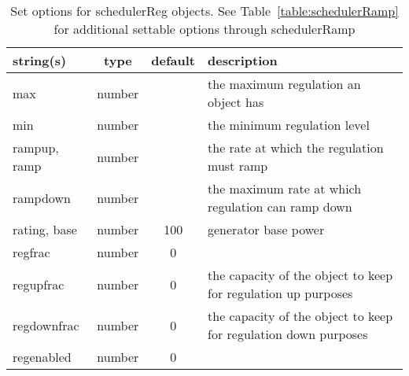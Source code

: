 \begin{table}[ht]
\centering
\begin{tabular}{p{5cm} c c p{7cm}}
\hline
string(s) & type & default & description \\
\hline
max & number &  & the maximum regulation an object has\\
min & number &  & the minimum regulation level\\
rampup, ramp & number &  & the rate at which the regulation must ramp\\
rampdown & number &  & the maximum rate at which regulation can ramp down\\
rating, base & number & 100 & generator base power\\
regfrac & number & 0 & \\
regupfrac & number & 0 & the capacity of the object to keep for regulation up purposes\\
regdownfrac & number & 0 & the capacity of the object to keep for regulation down purposes\\
regenabled & number & 0 & \\
\hline
\end{tabular}
\caption{Set options for schedulerReg objects. See Table~\ref{table:schedulerRamp} for additional settable options through schedulerRamp}
\label{table:schedulerReg}
\end{table}
